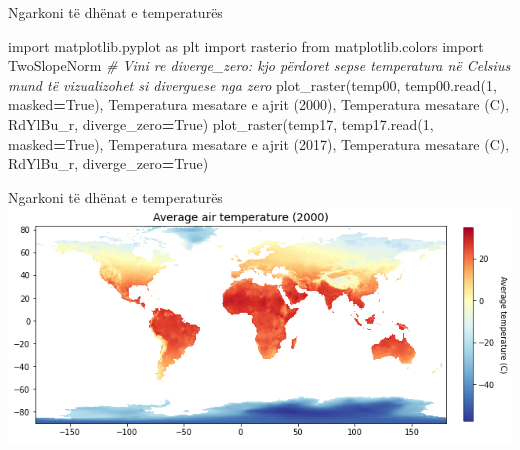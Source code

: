 \documentclass[
  ignorenonframetext,
]{beamer}
\newenvironment{Shaded}{\begin{snugshade}}{\end{snugshade}}
\newcommand{\CommentTok}[1]{\textcolor[rgb]{0.56,0.35,0.01}{\textit{#1}}}
\newcommand{\DecValTok}[1]{\textcolor[rgb]{0.00,0.00,0.81}{#1}}
\newcommand{\ImportTok}[1]{#1}
\newcommand{\NormalTok}[1]{#1}
\newcommand{\OperatorTok}[1]{\textcolor[rgb]{0.81,0.36,0.00}{\textbf{#1}}}
\newcommand{\StringTok}[1]{\textcolor[rgb]{0.31,0.60,0.02}{#1}}
\newcommand{\VariableTok}[1]{\textcolor[rgb]{0.00,0.00,0.00}{#1}}
\begin{document}
\begin{frame}[fragile]{Ngarkoni të dhënat e temperaturës}
\protect\hypertarget{ngarkoni-tuxeb-dhuxebnat-e-temperaturuxebs-3}{}

\begin{Shaded}
\begin{Highlighting}[]
\ImportTok{import}\NormalTok{ matplotlib.pyplot }\ImportTok{as}\NormalTok{ plt}
\ImportTok{import}\NormalTok{ rasterio}
\ImportTok{from}\NormalTok{ matplotlib.colors }\ImportTok{import}\NormalTok{ TwoSlopeNorm}
\CommentTok{\# Vini re diverge\_zero: kjo përdoret sepse temperatura në Celsius mund të vizualizohet si diverguese nga zero}
\NormalTok{plot\_raster(temp00, temp00.read(}\DecValTok{1}\NormalTok{, masked}\OperatorTok{=}\VariableTok{True}\NormalTok{), }\StringTok{\textquotesingle{}Temperatura mesatare e ajrit (2000)\textquotesingle{}}\NormalTok{, }\StringTok{\textquotesingle{}Temperatura mesatare (C)\textquotesingle{}}\NormalTok{, }
    \StringTok{\textquotesingle{}RdYlBu\_r\textquotesingle{}}\NormalTok{, diverge\_zero}\OperatorTok{=}\VariableTok{True}\NormalTok{)}
\NormalTok{plot\_raster(temp17, temp17.read(}\DecValTok{1}\NormalTok{, masked}\OperatorTok{=}\VariableTok{True}\NormalTok{), }\StringTok{\textquotesingle{}Temperatura mesatare e ajrit (2017)\textquotesingle{}}\NormalTok{, }\StringTok{\textquotesingle{}Temperatura mesatare (C)\textquotesingle{}}\NormalTok{, }
    \StringTok{\textquotesingle{}RdYlBu\_r\textquotesingle{}}\NormalTok{, diverge\_zero}\OperatorTok{=}\VariableTok{True}\NormalTok{)}
\end{Highlighting}
\end{Shaded}
\end{frame}

\begin{frame}{Ngarkoni të dhënat e temperaturës}
\protect\hypertarget{ngarkoni-tuxeb-dhuxebnat-e-temperaturuxebs-4}{}
\includegraphics{./Figs/temp200.png}
\end{frame}
\end{document}
